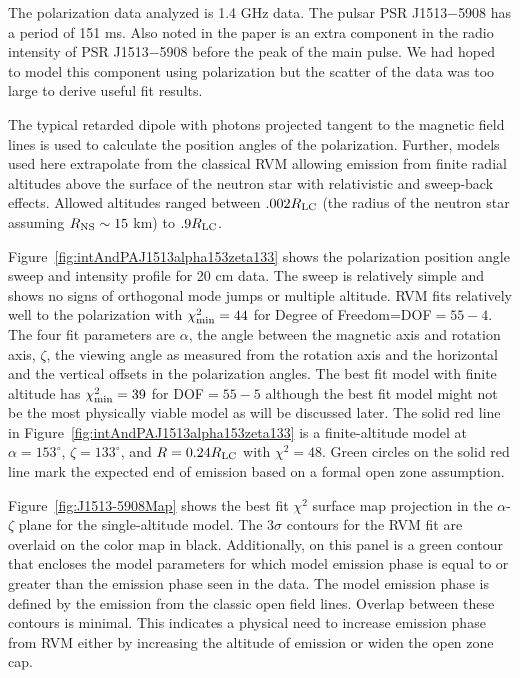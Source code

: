 The polarization data analyzed is 1.4 GHz data.
The pulsar PSR J1513$-$5908 has a period of 151 ms.
Also noted in the paper is
an extra component in the radio intensity of PSR J1513$-$5908
before the peak of the main pulse.
We had hoped to model this component using polarization
but the scatter of the data was too large to derive
useful fit results.

The typical retarded dipole with photons projected tangent to the magnetic
field lines is used to calculate the position 
angles of the polarization.  Further, models used here
extrapolate from the classical RVM allowing emission from finite
radial altitudes above the surface of the neutron star with relativistic and sweep-back effects.  
Allowed altitudes ranged between
$.002R_{\rm{LC}}$ (the radius of the neutron star assuming $R_{\rm{NS}}\sim 15$ km) to $.9R_{\rm{LC}}$.

Figure~\ref{fig:intAndPAJ1513alpha153zeta133} shows the polarization position angle sweep and intensity
profile for 20 cm data.  The sweep is relatively simple and shows no signs of orthogonal
mode jumps or multiple altitude.  RVM fits relatively well to the polarization with
$\chi^2_{\rm{min}}=44$ for Degree of Freedom=DOF$=55-4$.  The four fit parameters are $\alpha$, the angle between
the magnetic axis and rotation axis, $\zeta$, the viewing angle as measured from the rotation
axis and the horizontal and the vertical offsets in the 
polarization angles.  The best fit model
with finite altitude has $\chi^2_{\rm{min}}=39$ for DOF$=55-5$ although the best fit model might
not be the most physically viable model as will be discussed later.  The solid red line in
Figure~\ref{fig:intAndPAJ1513alpha153zeta133} is a finite-altitude model at $\alpha=153^\circ$,
$\zeta=133^\circ$, and $R=0.24R_{\rm{LC}}$ with $\chi^2=48$.  Green circles on the
solid red line mark the expected end of emission based on a formal open zone assumption.


Figure~\ref{fig:J1513-5908Map} shows the best fit $\chi^2$ surface map projection in the
$\alpha$-$\zeta$ plane for the single-altitude model.  
The $3\sigma$ contours for the RVM fit are
overlaid on the color map in black.  Additionally, on this panel is a green contour that
encloses the model parameters for which model emission phase is equal to or greater than
the emission phase seen in the data.  The model emission phase is defined by the emission
from the classic open field lines.  Overlap between these contours is minimal.  This indicates
a physical need to increase emission phase from RVM either by increasing the altitude of emission
or widen the open zone cap.

